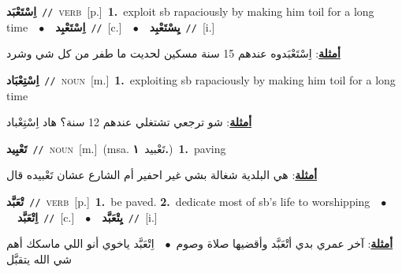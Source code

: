 \documentclass[10pt,a4paper,twoside]{article} %
\begin{document}
\begin{multicols}{2}
{\setlength\topsep{0pt}\textbf{\foreignlanguage{arabic}{اِسْتَعْبَد}}\ {\color{gray}\texttt{//}\color{black}}\ \textsc{verb}\ [p.]\ \textbf{1.}~exploit sb rapaciously by making him toil for a long time\ \ $\bullet$\ \ \setlength\topsep{0pt}\textbf{\foreignlanguage{arabic}{اِسْتَعْبِد}}\ {\color{gray}\texttt{//}\color{black}}\ [c.]\ \ $\bullet$\ \ \setlength\topsep{0pt}\textbf{\foreignlanguage{arabic}{يِسْتَعْبِد}}\ {\color{gray}\texttt{//}\color{black}}\ [i.]\  \begin{flushright}\color{gray}\foreignlanguage{arabic}{\textbf{\underline{\foreignlanguage{arabic}{أمثلة}}}: اِسْتَعْبَدوه عندهم 15 سنة مسكين لحديت ما طفر من كل شي وشرد}\end{flushright}\color{black}} \vspace{2mm}

{\setlength\topsep{0pt}\textbf{\foreignlanguage{arabic}{اِسْتِعْبَاد}}\ {\color{gray}\texttt{//}\color{black}}\ \textsc{noun}\ [m.]\ \textbf{1.}~exploiting sb rapaciously by making him toil for a long time\  \begin{flushright}\color{gray}\foreignlanguage{arabic}{\textbf{\underline{\foreignlanguage{arabic}{أمثلة}}}: شو ترجعي تشتغلي عندهم 12 سنة؟ هاد اِسْتِعْباد}\end{flushright}\color{black}} \vspace{2mm}

{\setlength\topsep{0pt}\textbf{\foreignlanguage{arabic}{تَعْبِيد}}\ {\color{gray}\texttt{//}\color{black}}\ \textsc{noun}\ [m.]\ \color{gray}(msa. \foreignlanguage{arabic}{تَعْبيد}~\foreignlanguage{arabic}{\textbf{١.}})\color{black}\ \textbf{1.}~paving\  \begin{flushright}\color{gray}\foreignlanguage{arabic}{\textbf{\underline{\foreignlanguage{arabic}{أمثلة}}}: هي البلدية شغالة بشي غير احفير أم الشارع عشان تَعْبيده قال}\end{flushright}\color{black}} \vspace{2mm}

{\setlength\topsep{0pt}\textbf{\foreignlanguage{arabic}{تْعَبَّد}}\ {\color{gray}\texttt{//}\color{black}}\ \textsc{verb}\ [p.]\ \textbf{1.}~be paved.  \textbf{2.}~dedicate most of sb's life to worshipping\ \ $\bullet$\ \ \setlength\topsep{0pt}\textbf{\foreignlanguage{arabic}{اِتْعَبَّد}}\ {\color{gray}\texttt{//}\color{black}}\ [c.]\ \ $\bullet$\ \ \setlength\topsep{0pt}\textbf{\foreignlanguage{arabic}{يِتْعَبَّد}}\ {\color{gray}\texttt{//}\color{black}}\ [i.]\  \begin{flushright}\color{gray}\foreignlanguage{arabic}{\textbf{\underline{\foreignlanguage{arabic}{أمثلة}}}: آخر عمري بدي أتْعَبَّد وأقضيها صلاة وصوم\ $\bullet$\ \  اِتْعَبَّد ياخوي أنو اللي ماسكك أهم شي الله يتقبَّل}\end{flushright}\color{black}} \vspace{2mm}


\end{multicols}
\end{document}
